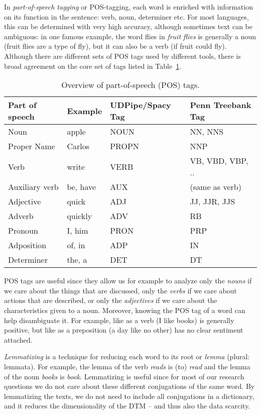 In \emph{part-of-speech tagging} or POS-tagging, each word is enriched with information on its function in the sentence: verb, noun, determiner etc.
For most languages, this can be determined with very high accuracy, although sometimes text can be ambiguous:
in one famous example, the word flies in \emph{fruit flies} is generally a noun (fruit flies are a type of fly), but it can also be a verb (if fruit could fly).
Although there are different sets of POS tags used by different tools, there is broad agreement on the core set of tags listed in Table~\ref{tab:postags}.

%

\begin{table}
  \caption{\label{tab:postags}Overview of part-of-speech (POS) tags.}{
  \begin{tabularx}{\textwidth}{llll}
    \toprule
    Part of speech & Example & UDPipe/Spacy Tag & Penn Treebank Tag \\
    \midrule
    Noun            & apple & NOUN & NN, NNS \\
    Proper Name     & Carlos & PROPN & NNP \\
    Verb            & write & VERB & VB, VBD, VBP, .. \\
    Auxiliary verb & be, have & AUX & (same as verb) \\
    Adjective       & quick & ADJ & JJ, JJR, JJS \\
    Adverb          & quickly & ADV & RB \\
    Pronoun         & I, him  & PRON & PRP \\
    Adposition      & of, in  & ADP & IN \\
    Determiner      & the, a & DET & DT \\
\bottomrule
  \end{tabularx}}{}
  \end{table}


POS tags are useful since they allow us for example to analyze only the \textit{nouns} if we care about the things that are discussed, only the \textit{verbs} if we care about actions that are described, or only the \textit{adjectives} if we care about the characteristics given to a noun.
Moreover, knowing the POS tag of a word can help disambiguate it.
For example, like as a verb (I like books) is generally positive, but like as a preposition (a day like no other) has no clear sentiment attached.

\emph{Lemmatizing} is a technique for reducing each word to its root or \emph{lemma} (plural: lemmata).
For example, the lemma of the verb \emph{reads} is (to) \emph{read} and the lemma of the noun \emph{books} is \emph{book}.
Lemmatizing is useful since for most of our research questions we do not care about these different conjugations of the same word.
By lemmatizing the texts, we do not need to include all conjugations in a dictionary,
and it reduces the dimensionality of the DTM -- and thus also the data scarcity.

